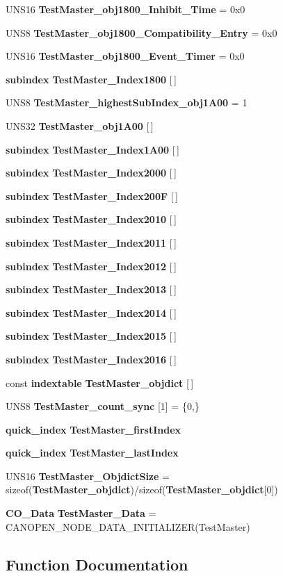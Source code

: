 \begin{CompactItemize}
\item 
UNS16 {\bf Test\-Master\_\-obj1800\_\-Inhibit\_\-Time} = 0x0
\item 
UNS8 {\bf Test\-Master\_\-obj1800\_\-Compatibility\_\-Entry} = 0x0
\item 
UNS16 {\bf Test\-Master\_\-obj1800\_\-Event\_\-Timer} = 0x0
\item 
{\bf subindex} {\bf Test\-Master\_\-Index1800} [$\,$]
\item 
UNS8 {\bf Test\-Master\_\-highest\-Sub\-Index\_\-obj1A00} = 1
\item 
UNS32 {\bf Test\-Master\_\-obj1A00} [$\,$]
\item 
{\bf subindex} {\bf Test\-Master\_\-Index1A00} [$\,$]
\item 
{\bf subindex} {\bf Test\-Master\_\-Index2000} [$\,$]
\item 
{\bf subindex} {\bf Test\-Master\_\-Index200F} [$\,$]
\item 
{\bf subindex} {\bf Test\-Master\_\-Index2010} [$\,$]
\item 
{\bf subindex} {\bf Test\-Master\_\-Index2011} [$\,$]
\item 
{\bf subindex} {\bf Test\-Master\_\-Index2012} [$\,$]
\item 
{\bf subindex} {\bf Test\-Master\_\-Index2013} [$\,$]
\item 
{\bf subindex} {\bf Test\-Master\_\-Index2014} [$\,$]
\item 
{\bf subindex} {\bf Test\-Master\_\-Index2015} [$\,$]
\item 
{\bf subindex} {\bf Test\-Master\_\-Index2016} [$\,$]
\item 
const {\bf indextable} {\bf Test\-Master\_\-objdict} [$\,$]
\item 
UNS8 {\bf Test\-Master\_\-count\_\-sync} [1] = \{0,\}
\item 
{\bf quick\_\-index} {\bf Test\-Master\_\-first\-Index}
\item 
{\bf quick\_\-index} {\bf Test\-Master\_\-last\-Index}
\item 
UNS16 {\bf Test\-Master\_\-Objdict\-Size} = sizeof({\bf Test\-Master\_\-objdict})/sizeof({\bf Test\-Master\_\-objdict}[0])
\item 
{\bf CO\_\-Data} {\bf Test\-Master\_\-Data} = CANOPEN\_\-NODE\_\-DATA\_\-INITIALIZER(Test\-Master)
\end{CompactItemize}


\subsection{Function Documentation}
